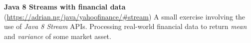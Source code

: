 \documentclass[letterpaper,11pt]{article}
\newcommand{\resumeItem}[3]{
	\item\small{
		\textbf{#1}\hfill\tiny{#2\\}\small{ #3 \vspace{-2pt}}
	}
}
\newcommand{\resumeSubItem}[3]{\resumeItem{#1}{#2}{#3}\vspace{-2pt}}
\begin{document}
\begin{itemize}
{	      \textbf{Java 8 Streams with financial data}
	      \hfill
	      \tiny
	      (\href{https://adrian.ng/java/yahoofinance/\#stream}{https://adrian.ng/java/yahoofinance/\#stream})
	      \small
	      \newline
	      A small exercise involving the use of \textit{Java 8 Stream} APIs. Processing real-world financial data to return \textit{mean} and \textit{variance} of some market asset.
	      }
\end{itemize}


\newpage
\end{document}
